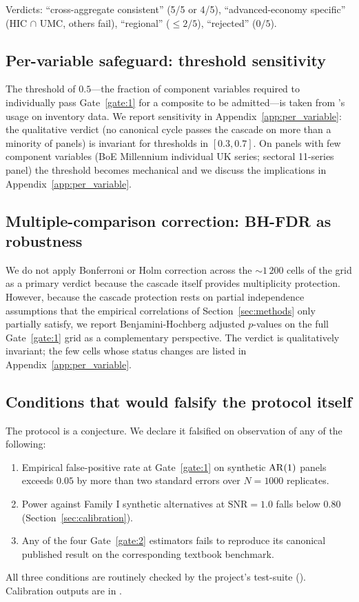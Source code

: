 Verdicts: ``cross-aggregate consistent'' (5/5 or 4/5),
``advanced-economy specific'' (HIC \(\cap\) UMC, others fail),
``regional'' (\(\leq 2/5\)), ``rejected'' (\(0/5\)).

\subsection{Per-variable safeguard: threshold sensitivity}

The threshold of \(0.5\)---the fraction of component variables
required to individually pass Gate~\ref{gate:1} for a composite
to be admitted---is taken from \citet{wen2005}'s usage on
inventory data. We report sensitivity in
Appendix~\ref{app:per_variable}: the qualitative verdict (no
canonical cycle passes the cascade on more than a minority of
panels) is invariant for thresholds in \([0.3, 0.7]\). On panels
with few component variables (BoE Millennium individual UK
series; sectoral 11-series panel) the threshold becomes
mechanical and we discuss the implications in
Appendix~\ref{app:per_variable}.

\subsection{Multiple-comparison correction: BH-FDR as robustness}

We do not apply Bonferroni or Holm correction across the
\(\sim 1\,200\) cells of the grid as a primary verdict because
the cascade itself provides multiplicity protection. However,
because the cascade protection rests on partial independence
assumptions that the empirical correlations of
Section~\ref{sec:methods} only partially satisfy, we report
Benjamini-Hochberg \citep{benjamini_hochberg1995} adjusted
\(p\)-values on the full Gate~\ref{gate:1} grid as a
complementary perspective. The verdict is qualitatively
invariant; the few cells whose status changes are listed in
Appendix~\ref{app:per_variable}.

\subsection{Conditions that would falsify the protocol itself}

The protocol is a conjecture. We declare it falsified on
observation of any of the following:
\begin{enumerate}
\item[(i)] Empirical false-positive rate at Gate~\ref{gate:1} on
  synthetic \(\mathrm{AR}(1)\) panels exceeds \(0.05\) by more than two
  standard errors over \(N=1000\) replicates.
\item[(ii)] Power against Family I synthetic alternatives at
  \(\mathrm{SNR}=1.0\) falls below \(0.80\)
  (Section~\ref{sec:calibration}).
\item[(iii)] Any of the four Gate~\ref{gate:2} estimators fails
  to reproduce its canonical published result on the
  corresponding textbook benchmark.
\end{enumerate}
All three conditions are routinely checked by the project's
test-suite (). Calibration outputs are in
.
